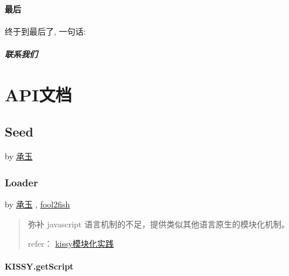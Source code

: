 \documentclass[letterpaper,10pt,english]{sphinxmanual}
\begin{document}
\subsubsection{最后}
\label{quickstart/nextstep:id4}
终于到最后了, 一句话:
\paragraph{联系我们}


\chapter{API文档}
\label{api/index:api}\label{api/index::doc}\label{api/index:id1}

\section{Seed}
\label{api/seed/index:seed}\label{api/seed/index::doc}\label{api/seed/index:kissy-seed}
by \href{mailto:yiminghe@gmail.com}{承玉}
\label{api/seed/loader/index:module-Loader}

\subsection{Loader}
\label{api/seed/loader/index::doc}\label{api/seed/loader/index:loader}
by \href{mailto:yiminghe@gmail.com}{承玉} , \href{mailto:fool2fish@gmail.com}{fool2fish}
\begin{quote}

\begin{DUlineblock}{0em}
\item[] 弥补 javascript 语言机制的不足，提供类似其他语言原生的模块化机制。
\item[] refer： \href{http://goo.gl/l6atd}{kissy模块化实践}
\end{DUlineblock}
\end{quote}


\subsubsection{KISSY.getScript}
\label{api/seed/loader/getScript:kissy-getscript}\label{api/seed/loader/getScript::doc}
\end{document}
